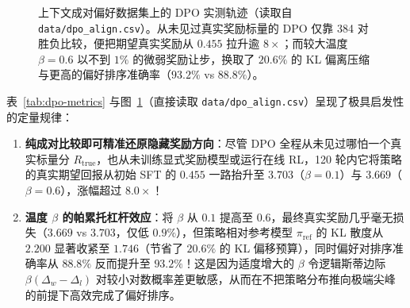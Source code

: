\begin{figure}[htbp]
\caption{上下文成对偏好数据集上的 DPO 实测轨迹（读取自 \texttt{data/dpo\_align.csv}）。从未见过真实奖励标量的 DPO 仅靠 384 对胜负比较，便把期望真实奖励从 $0.455$ 拉升逾 $8\times$；而较大温度 $\beta=0.6$ 以不到 $1\%$ 的微弱奖励让步，换取了 $20.6\%$ 的 KL 偏离压缩与更高的偏好排序准确率（$93.2\%$ vs $88.8\%$）。}
\label{fig:dpo-align}
\end{figure}

表~\ref{tab:dpo-metrics} 与图~\ref{fig:dpo-align}（直接读取 \texttt{data/dpo\_align.csv}）呈现了极具启发性的定量规律：
\begin{enumerate}
  \item \textbf{纯成对比较即可精准还原隐藏奖励方向}：尽管 DPO 全程从未见过哪怕一个真实标量分 $R_{\mathrm{true}}$，也从未训练显式奖励模型或运行在线 RL，120 轮内它将策略的真实期望回报从初始 SFT 的 \textbf{$0.455$} 一路抬升至 \textbf{$3.703$}（$\beta=0.1$）与 \textbf{$3.669$}（$\beta=0.6$），涨幅超过 \textbf{$8.0\times$}！
  \item \textbf{温度 $\beta$ 的帕累托杠杆效应}：将 $\beta$ 从 $0.1$ 提高至 $0.6$，最终真实奖励几乎毫无损失（$3.669$ vs $3.703$，仅低 $0.9\%$），但策略相对参考模型 $\pi_{\mathrm{ref}}$ 的 KL 散度从 \textbf{$2.200$} 显著收紧至 \textbf{$1.746$}（节省了 \textbf{$20.6\%$} 的 KL 偏移预算），同时偏好对排序准确率从 \textbf{$88.8\%$} 反而提升至 \textbf{$93.2\%$}！这是因为适度增大的 $\beta$ 令逻辑斯蒂边际 $\beta(\Delta_w - \Delta_l)$ 对较小对数概率差更敏感，从而在不把策略分布推向极端尖峰的前提下高效完成了偏好排序。
\end{enumerate}

